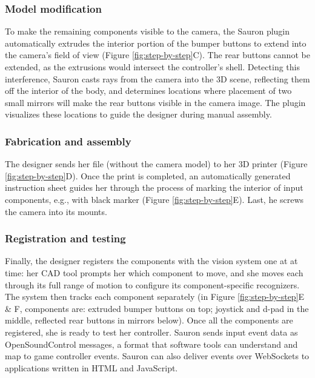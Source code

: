 \subsubsection{Model modification} To make the remaining components visible to the camera, the Sauron plugin automatically extrudes the interior portion of the bumper buttons to extend into the camera's field of view (Figure \ref{fig:step-by-step}C). The rear buttons cannot be extended, as the extrusions would intersect the controller's shell. Detecting this interference, Sauron casts rays from the camera into the 3D scene, reflecting them off the interior of the body, and determines locations where placement of two small mirrors will make the rear buttons visible in the camera image. The plugin visualizes these locations to guide the designer during manual assembly.

\subsubsection{Fabrication and assembly} %
The designer sends her file (without the camera model) to her 3D printer (Figure \ref{fig:step-by-step}D). Once the print is completed, an automatically generated instruction sheet guides her through the process of marking the interior of input components, e.g., with black marker (Figure \ref{fig:step-by-step}E). Last, he screws the camera into its mounts. 

\subsubsection{Registration and testing} Finally, the designer registers the components with the vision system one at at time: her CAD tool prompts her which component to move, and she moves each through its full range of motion to configure its component-specific recognizers. The system then tracks each component separately (in Figure \ref{fig:step-by-step}E \& F, components are: extruded bumper buttons on top; joystick and d-pad in the middle, reflected rear buttons in mirrors below). Once all the components are registered, she is ready to test her controller.
Sauron sends input event data as OpenSoundControl messages, a format that software tools can understand and map to game controller events. Sauron can also deliver events over WebSockets to applications written in HTML and JavaScript.

